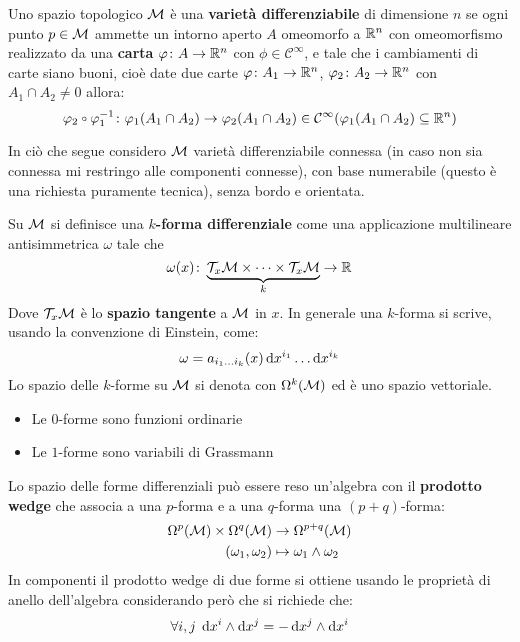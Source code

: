 \begin{definition}
  Uno spazio topologico $ \mathcal{M} $ è una \textbf{varietà differenziabile}
  di dimensione $ n $ se ogni punto $ p \in \mathcal{M} $ ammette un intorno aperto $ A $ omeomorfo a $ \mathbb{R}^{n} $
  con omeomorfismo realizzato da una \textbf{carta}
  $ \varphi \colon A \to \mathbb{R}^{n} $ con $ \phi \in \mathcal{C}^\infty $, e tale che i cambiamenti di carte siano buoni, cioè
  date due carte $ \varphi \colon A_1 \to \mathbb{R}^{n} $, $ \varphi_2 \colon A_2 \to \mathbb{R}^{n} $ con $ A_1 \cap A_2 \not = 0 $ allora:
  \[
    \phi_2 \circ \phi_1^{-1} \colon \phi_1(A_1 \cap A_2) \to \phi_2(A_1 \cap A_2) \in \mathcal{C}^\infty(\phi_1(A_1 \cap A_2) \subseteq \RN{n})
  \]
\end{definition}
In ciò che segue considero $ \mathcal{M} $ varietà differenziabile connessa (in caso non
sia connessa mi restringo alle componenti connesse), con base numerabile
(questo è una richiesta puramente tecnica), senza bordo e orientata.
\begin{definition}
  Su $ \mathcal{M} $ si definisce una \textbf{$ k $-forma differenziale} come
  una applicazione multilineare antisimmetrica $ \omega $ tale che
  \[
    \omega(x) \colon \underbrace{\mathcal{T}_x\mathcal{M} \times \dots \times \mathcal{T}_x\mathcal{M}}_{k} \to \mathbb{R}^{}
  \]
  Dove $ \mathcal{T}_x\mathcal{M} $ è lo \textbf{spazio tangente} a $ \mathcal{M} $ in $ x $.
  In generale una $ k $-forma si scrive, usando la convenzione di Einstein, come:
  \[
    \omega = a_{i_1\dots i_k}(x) \operatorname{d}\!{x}^{i_1} \dots \operatorname{d}\!{x}^{i_k}
  \]
  Lo spazio delle $ k $-forme su $ \mathcal{M} $ si denota con $ \Omega^k(\mathcal{M}) $ ed è uno spazio vettoriale.
\end{definition}
\begin{example}\hfill
  \begin{itemize}
  \item Le $ 0 $-forme sono funzioni ordinarie
  \item Le $ 1 $-forme sono variabili di Grassmann
  \end{itemize}
\end{example}
\begin{definition}
  Lo spazio delle forme differenziali può essere reso un'algebra con il \textbf{prodotto wedge}
  che associa a una $ p $-forma e a una $ q $-forma una $ (p+q) $-forma:
  \begin{align*}
    \Omega^p(\mathcal{M}) \times \Omega^q(\mathcal{M}) & \to \Omega^{p+q}(\mathcal{M}) \\
    (\omega_1, \omega_2) & \mapsto \omega_1 \wedge \omega_2
  \end{align*}
  In componenti il prodotto wedge di due forme si ottiene usando le proprietà di anello dell'algebra
  considerando però che si richiede che:
  \[
    \forall i,j \; \operatorname{d}\!{x}^i \wedge \operatorname{d}\!{x}^j = - \operatorname{d}\!{x}^j \wedge \operatorname{d}\!{x}^i
  \]
\end{definition}

